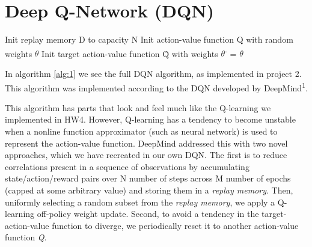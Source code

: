 \documentclass[conference]{IEEEtran}
\begin{document}
\section{Deep Q-Network (DQN)}
\begin{algorithm}
    \label{alg:1}
    \SetAlgoLined
    Init replay memory D to capacity N\;
    Init action-value function Q with random weights $\theta$\;
    Init target action-value function \^Q with weights $\theta$\textsuperscript{-} = $\theta$\;
    \caption{deep Q-learning with experience replay}
\end{algorithm}

In algorithm \ref{alg:1} we see the full DQN algorithm, as implemented in project 2. This algorithm was implemented according to the DQN developed by DeepMind\textsuperscript{1}.

This algorithm has parts that look and feel much like the Q-learning we implemented in HW4. However, Q-learning has a tendency to become unstable when a nonline function approximator (such as neural network) is used to represent the action-value function. DeepMind addressed this with two novel approaches, which we have recreated in our own DQN. The first is to reduce correlations present in a sequence of observations by accumulating state/action/reward pairs over N number of steps across M number of epochs (capped at some arbitrary value) and storing them in a \textit{replay memory}. Then, uniformly selecting a random subset from the \textit{replay memory}, we apply a Q-learning off-policy weight update. Second, to avoid a tendency in the target-action-value  function to diverge, we periodically reset it to another action-value function \textit{Q}.
\end{document}
